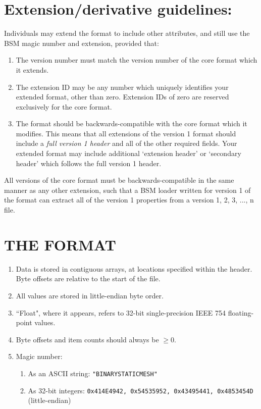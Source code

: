 \documentclass{article}
\begin{document}
\section{Extension/derivative guidelines:}
Individuals may extend the format to include other attributes, and still use the BSM magic number and extension, provided that:
\begin{enumerate}
	\item The version number must match the version number of the core format which it extends.
	\item The extension ID may be any number which uniquely identifies your extended format, other than zero.  Extension IDs of zero are reserved exclusively for the core format.
	\item The format should be backwards-compatible with the core format which it modifies.  This means that all extensions of the version 1 format should include a \textit{full version 1 header} and all of the other required fields.  Your extended format may include additional `extension header' or `secondary header' which follows the full version 1 header.
\end{enumerate}

All versions of the core format must be backwards-compatible in the same manner as any other extension, such that a BSM loader written for version 1 of the format can extract all of the version 1 properties from a version 1, 2, 3, ..., n file.

\section{THE FORMAT}

\begin{enumerate}
	\item Data is stored in contiguous arrays, at locations specified within the header.  Byte offsets are relative to the start of the file.
	\item All values are stored in little-endian byte order.
	\item ``Float", where it appears, refers to 32-bit single-precision IEEE 754 floating-point values.
	\item Byte offsets and item counts should always be $\geq 0$.
	\item Magic number:
	\begin{enumerate}
		\item As an ASCII string: \texttt{"BINARYSTATICMESH"}
		\item As 32-bit integers: \texttt{0x414E4942, 0x54535952, 0x43495441, 0x4853454D} (little-endian)
	\end{enumerate}
\end{enumerate}
\end{document}

